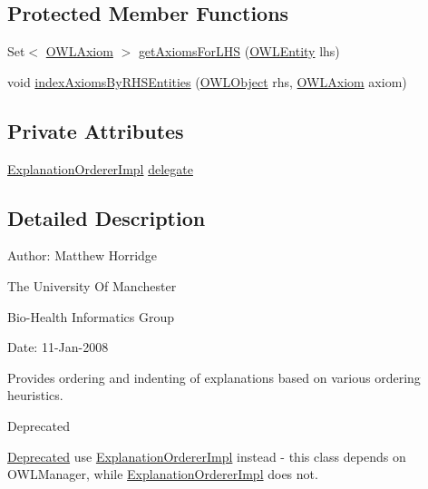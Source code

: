\subsection*{Protected Member Functions}
\begin{DoxyCompactItemize}
\item 
Set$<$ \hyperlink{interfaceorg_1_1semanticweb_1_1owlapi_1_1model_1_1_o_w_l_axiom}{O\-W\-L\-Axiom} $>$ \hyperlink{classuk_1_1ac_1_1manchester_1_1cs_1_1owl_1_1explanation_1_1ordering_1_1_default_explanation_orderer_a129b187a3b17e102f52984fbd87ef0a4}{get\-Axioms\-For\-L\-H\-S} (\hyperlink{interfaceorg_1_1semanticweb_1_1owlapi_1_1model_1_1_o_w_l_entity}{O\-W\-L\-Entity} lhs)
\item 
void \hyperlink{classuk_1_1ac_1_1manchester_1_1cs_1_1owl_1_1explanation_1_1ordering_1_1_default_explanation_orderer_ac2a9fafa637e1c58a6e96c2b93cd1c1f}{index\-Axioms\-By\-R\-H\-S\-Entities} (\hyperlink{interfaceorg_1_1semanticweb_1_1owlapi_1_1model_1_1_o_w_l_object}{O\-W\-L\-Object} rhs, \hyperlink{interfaceorg_1_1semanticweb_1_1owlapi_1_1model_1_1_o_w_l_axiom}{O\-W\-L\-Axiom} axiom)
\end{DoxyCompactItemize}
\subsection*{Private Attributes}
\begin{DoxyCompactItemize}
\item 
\hyperlink{classuk_1_1ac_1_1manchester_1_1cs_1_1owl_1_1explanation_1_1ordering_1_1_explanation_orderer_impl}{Explanation\-Orderer\-Impl} \hyperlink{classuk_1_1ac_1_1manchester_1_1cs_1_1owl_1_1explanation_1_1ordering_1_1_default_explanation_orderer_ab9b17c66be5e37054a61ceb608b047cd}{delegate}
\end{DoxyCompactItemize}


\subsection{Detailed Description}
Author\-: Matthew Horridge\par
 The University Of Manchester\par
 Bio-\/\-Health Informatics Group\par
 Date\-: 11-\/\-Jan-\/2008\par
 \par
 

Provides ordering and indenting of explanations based on various ordering heuristics.

\begin{DoxyRefDesc}{Deprecated}
\item[\hyperlink{deprecated__deprecated000036}{Deprecated}]use \hyperlink{classuk_1_1ac_1_1manchester_1_1cs_1_1owl_1_1explanation_1_1ordering_1_1_explanation_orderer_impl}{Explanation\-Orderer\-Impl} instead -\/ this class depends on O\-W\-L\-Manager, while \hyperlink{classuk_1_1ac_1_1manchester_1_1cs_1_1owl_1_1explanation_1_1ordering_1_1_explanation_orderer_impl}{Explanation\-Orderer\-Impl} does not. \end{DoxyRefDesc}


